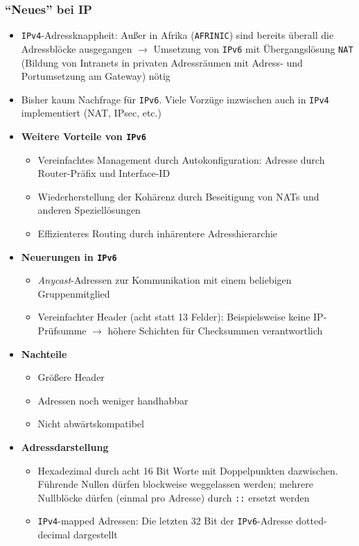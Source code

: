 \subsubsection{"`Neues"' bei IP}
\begin{itemize}
	\item \texttt{IPv4}-Adressknappheit: Außer in Afrika (\texttt{AFRINIC}) sind bereits überall die Adressblöcke ausgegangen \(\rightarrow\) Umsetzung von \texttt{IPv6} mit Übergangslösung \texttt{NAT} (Bildung von Intranets in privaten Adressräumen mit Adress- und Portumsetzung am Gateway) nötig
	\item Bisher kaum Nachfrage für \texttt{IPv6}. Viele Vorzüge inzwischen auch in \texttt{IPv4} implementiert (NAT, IPsec, etc.)
	\item \textbf{Weitere Vorteile von \texttt{IPv6}}
	\begin{itemize}
		\item Vereinfachtes Management durch Autokonfiguration: Adresse durch Router-Präfix und Interface-ID
		\item Wiederherstellung der Kohärenz durch Beseitigung von NATs und anderen Speziellösungen
		\item Effizienteres Routing durch inhärentere Adresshierarchie
	\end{itemize}
	\item \textbf{Neuerungen in \texttt{IPv6}}
	\begin{itemize}
		\item \textit{Anycast}-Adressen zur Kommunikation mit einem beliebigen Gruppenmitglied
		\item Vereinfachter Header (acht statt 13 Felder): Beispielsweise keine IP-Prüfsumme \(\rightarrow\) höhere Schichten für Checksummen verantwortlich
	\end{itemize}
	\item \textbf{Nachteile}
	\begin{itemize}
		\item Größere Header
		\item Adressen noch weniger handhabbar
		\item Nicht abwärtskompatibel
	\end{itemize}
	\item \textbf{Adressdarstellung}
	\begin{itemize}
		\item Hexadezimal durch acht 16 Bit Worte mit Doppelpunkten dazwischen. Führende Nullen dürfen blockweise weggelassen werden; mehrere Nullblöcke dürfen (einmal pro Adresse) durch \texttt{::} ersetzt werden
		\item \texttt{IPv4}-mapped Adressen: Die letzten 32 Bit der \texttt{IPv6}-Adresse dotted-decimal dargestellt
	\end{itemize}
\end{itemize}



